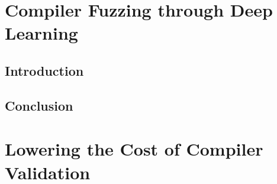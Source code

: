 \ifstapled
\chapter{Compiler Fuzzing through Deep Learning}
\section{Introduction}
\lipsum[1-2]

\section{Conclusion}
\lipsum[1-2]
\else
\chapter{Lowering the Cost of Compiler Validation}
\label{chap:deepsmith}






\fi
